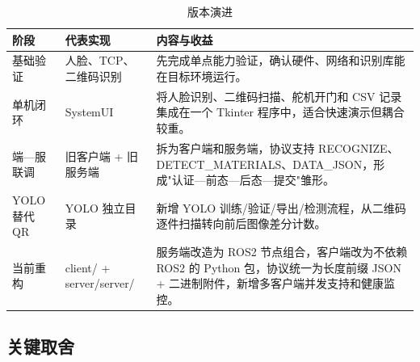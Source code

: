 \documentclass[12pt]{article}
\newcommand{\code}[1]{{\ttfamily #1}}
\begin{document}
\begin{table}[H]
	\centering
	\caption{版本演进}
	\label{tab:iteration}
	\small
	\begin{tabularx}{\textwidth}{M{2.0cm}M{3.2cm}Y}
		\toprule
		阶段         & 代表实现                               & 内容与收益                                                                                                                             \\
		\midrule
		基础验证     & 人脸、TCP、二维码识别                  & 先完成单点能力验证，确认硬件、网络和识别库能在目标环境运行。                                                                           \\
		单机闭环     & \code{SystemUI}                        & 将人脸识别、二维码扫描、舵机开门和 CSV 记录集成在一个 Tkinter 程序中，适合快速演示但耦合较重。                                         \\
		端—服联调    & 旧客户端 + 旧服务端                    & 拆为客户端和服务端，协议支持 \code{RECOGNIZE}、\code{DETECT\_MATERIALS}、\code{DATA\_JSON}，形成"认证—前态—后态—提交"雏形。            \\
		YOLO 替代 QR & YOLO 独立目录                          & 新增 YOLO 训练/验证/导出/检测流程，从二维码逐件扫描转向前后图像差分计数。                                                              \\
		当前重构     & \code{client/} + \code{server/server/} & 服务端改造为 ROS2 节点组合，客户端改为不依赖 ROS2 的 Python 包，协议统一为长度前缀 JSON + 二进制附件，新增多客户端并发支持和健康监控。 \\
		\bottomrule
	\end{tabularx}
\end{table}

\subsection{关键取舍}
\end{document}

